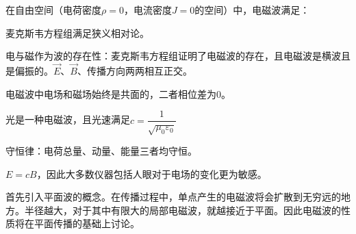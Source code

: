\begin{prove}[电磁波的性质]
    在自由空间（电荷密度$\rho = 0$，电流密度$J = 0$的空间）中，电磁波满足：
    \begin{Itemize}
        \item 麦克斯韦方程组满足狭义相对论。
        \item 电与磁作为波的存在性：麦克斯韦方程组证明了电磁波的存在，且电磁波是横波且是偏振的。$\vec{E}$、$\vec{B}$、传播方向两两相互正交。
        \item 电磁波中电场和磁场始终是共面的，二者相位差为0。
        \item 光是一种电磁波，且光速满足$c=\dfrac{1}{\sqrt{\mu_0\varepsilon_0}}$
        \item 守恒律：电荷总量、动量、能量三者均守恒。
        \item $E = cB$，因此大多数仪器包括人眼对于电场的变化更为敏感。
    \end{Itemize}
    \tcbrule
    首先引入平面波的概念。在传播过程中，单点产生的电磁波将会扩散到无穷远的地方。半径越大，对于其中有限大的局部电磁波，就越接近于平面。因此电磁波的性质将在平面传播的基础上讨论。


\end{prove}
